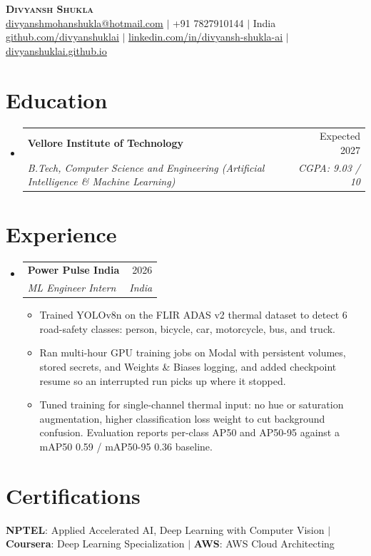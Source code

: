 \documentclass[letterpaper,11pt]{article}
\makeatletter
\newcommand{\graddate}{Expected 2027}
\newcommand{\introle}{ML Engineer Intern}
\newcommand{\intdates}{2026}
\newcommand{\resumeItem}[1]{
  \item\small{
    {#1 \vspace{-2pt}}
  }
}
\newcommand{\resumeSubheading}[4]{
  \vspace{-2pt}\item
    \begin{tabular*}{0.97\textwidth}[t]{l@{\extracolsep{\fill}}r}
      \textbf{#1} & #2 \\
      \textit{\small#3} & \textit{\small #4} \\
    \end{tabular*}\vspace{-8pt}
}
\newcommand{\resumeSubHeadingListStart}{\begin{itemize}[leftmargin=0.15in, label={}, itemsep=0pt]}
\newcommand{\resumeSubHeadingListEnd}{\end{itemize}\vspace{-6pt}}
\newcommand{\resumeItemListStart}{\begin{itemize}[itemsep=-1.2pt]}
\newcommand{\resumeItemListEnd}{\end{itemize}\vspace{-4pt}}
\makeatother
\begin{document}
\begin{center}
    \textbf{\Huge \scshape Divyansh Shukla} \\ \vspace{2pt}
    \small
    \href{mailto:divyanshmohanshukla@hotmail.com}{\uline{divyanshmohanshukla@hotmail.com}} $|$
    +91 7827910144 $|$
    India \\ \vspace{1pt}
    \href{https://github.com/divyanshuklai}{\uline{github.com/divyanshuklai}} $|$
    \href{https://www.linkedin.com/in/divyansh-shukla-ai/}{\uline{linkedin.com/in/divyansh-shukla-ai}} $|$
    \href{https://divyanshuklai.github.io}{\uline{divyanshuklai.github.io}}
\end{center}

\section{Education}
  \resumeSubHeadingListStart
    \resumeSubheading
      {Vellore Institute of Technology}{\graddate}
      {B.Tech, Computer Science and Engineering (Artificial Intelligence \& Machine Learning)}{CGPA: 9.03 / 10}
  \resumeSubHeadingListEnd

\section{Experience}
  \resumeSubHeadingListStart
    \resumeSubheading
      {Power Pulse India}{\intdates}
      {\introle}{India}
      \resumeItemListStart
        \resumeItem{Trained YOLOv8n on the FLIR ADAS v2 thermal dataset to detect 6 road-safety classes: person, bicycle, car, motorcycle, bus, and truck.}
        \resumeItem{Ran multi-hour GPU training jobs on Modal with persistent volumes, stored secrets, and Weights \& Biases logging, and added checkpoint resume so an interrupted run picks up where it stopped.}
        \resumeItem{Tuned training for single-channel thermal input: no hue or saturation augmentation, higher classification loss weight to cut background confusion. Evaluation reports per-class AP50 and AP50-95 against a mAP50 0.59 / mAP50-95 0.36 baseline.}
      \resumeItemListEnd
  \resumeSubHeadingListEnd

\section{Certifications}
 \begin{itemize}[leftmargin=0.15in, label={}]
    \small{\item{
     \textbf{NPTEL}{: Applied Accelerated AI, Deep Learning with Computer Vision} \hspace{3pt}$|$\hspace{3pt} \textbf{Coursera}{: Deep Learning Specialization} \hspace{3pt}$|$\hspace{3pt} \textbf{AWS}{: AWS Cloud Architecting}
    }}
 \end{itemize}
\end{document}
